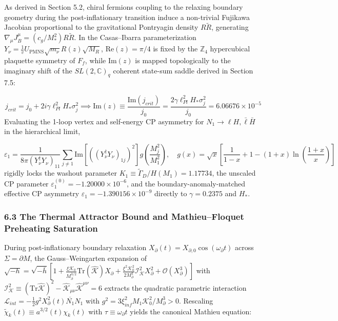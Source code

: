 \documentclass[aps,prd,onecolumn,superscriptaddress,nofootinbib,longbibliography,10pt]{revtex4-2}
\begin{document}
As derived in Section 5.2, chiral fermions coupling to the relaxing boundary geometry during the post-inflationary transition induce a non-trivial Fujikawa Jacobian proportional to the gravitational Pontryagin density \(R\tilde{R}\), generating \(\nabla_\mu J_B^\mu = (c_g / M_*^2)R\tilde{R}\). In the Casas--Ibarra parameterization \(Y_\nu = \frac{1}{v} U_{\mathrm{PMNS}} \sqrt{m_\nu} R(z) \sqrt{M_R}\), \(\mathrm{Re}(z) = \pi/4\) is fixed by the \(\mathbb{Z}_4\) hypercubical plaquette symmetry of \(F_f\), while \(\mathrm{Im}(z)\) is mapped topologically to the imaginary shift of the \(SL(2,\mathbb{C})_q\) coherent state-sum saddle derived in Section 7.5:


\[j_{crit} = j_0 + 2i\gamma \ell_{Pl}^2 H_* \sigma_j^2 \implies \mathrm{Im}(z) \equiv \frac{\mathrm{Im}(j_{crit})}{j_0} = \frac{2\gamma \ell_{Pl}^2 H_* \sigma_j^2}{j_0} = 6.06676 \times 10^{-5}\]
Evaluating the 1-loop vertex and self-energy CP asymmetry for \(N_1 \to \ell H, \bar{\ell}\bar{H}\) in the hierarchical limit,


\[\varepsilon_1 = \frac{1}{8\pi(Y_\nu^\dagger Y_\nu)_{11}} \sum_{j \neq 1} \mathrm{Im}[((Y_\nu^\dagger Y_\nu)_{1j})^2] g\!\left(\frac{M_j^2}{M_1^2}\right), \quad g(x) = \sqrt{x} \left[ \frac{1}{1-x} + 1 - (1+x)\ln\!\left(\frac{1+x}{x}\right) \right]\]
rigidly locks the washout parameter \(K_1 \equiv \tilde{\Gamma}_D / H(M_1) = 1.17734\), the unscaled CP parameter \(\varepsilon_1^{(0)} = -1.20000 \times 10^{-6}\), and the boundary-anomaly-matched effective CP asymmetry \(\varepsilon_1 = -1.390156 \times 10^{-9}\) directly to \(\gamma = 0.2375\) and \(H_*\).




\subsubsection*{6.3 The Thermal Attractor Bound and Mathieu--Floquet Preheating Saturation}

During post-inflationary boundary relaxation \(X_\partial(t) = X_{\partial,0} \cos(\omega_\partial t)\) across \(\Sigma = \partial M\), the Gauss--Weingarten expansion of \(\sqrt{-h} = \sqrt{-\bar{h}} \left[ 1 + \frac{\xi \mathcal{K}_0}{M_\partial^{3/2}} \mathrm{Tr}(\hat{\mathcal{K}}) X_\partial + \frac{\xi^2 \mathcal{K}_0^2}{2M_\partial^3} \mathcal{I}_{\mathcal{K}}^2 X_\partial^2 + \mathcal{O}(X_\partial^3) \right]\) with \(\mathcal{I}_{\mathcal{K}}^2 \equiv (\mathrm{Tr}\hat{\mathcal{K}})^2 - \hat{\mathcal{K}}_{\mu\nu}\hat{\mathcal{K}}^{\mu\nu} = 6\) extracts the quadratic parametric interaction \(\mathcal{L}_{int} = -\frac{1}{2}g^2 X_\partial^2(t) \overline{N_1} N_1\) with \(g^2 = 3\xi_{inf}^2 M_1 \mathcal{K}_0^2 / M_\partial^3 > 0\). Rescaling \(\tilde{\chi}_k(t) \equiv a^{3/2}(t)\chi_k(t)\) with \(\tau \equiv \omega_\partial t\) yields the canonical Mathieu equation:
\end{document}
